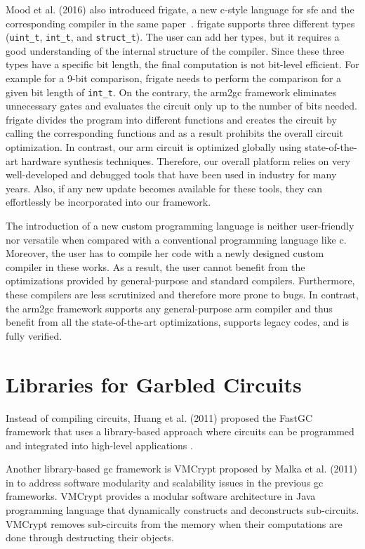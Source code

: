 Mood et al. (2016) also introduced \gls{frigate}, a new \gls{c}-style language for \acrshort{sfe} and the corresponding compiler in the same paper~\cite{mood2016frigate}.
\gls{frigate} supports three different types (\texttt{uint\_t}, \texttt{int\_t}, and \texttt{struct\_t}).
The user can add her types, but it requires a good understanding of the internal structure of the compiler.
Since these three types have a specific bit length, the final computation is not bit-level efficient.
For example for a 9-bit comparison, \gls{frigate} needs to perform the comparison for a given bit length of \texttt{int\_t}.
On the contrary, the \gls{arm2gc} framework eliminates unnecessary gates and evaluates the circuit only up to the number of bits needed.
\gls{frigate} divides the program into different functions and creates the circuit by calling the corresponding functions and as a result prohibits the overall circuit optimization.
In contrast, our \gls{arm} circuit is optimized globally using state-of-the-art hardware synthesis techniques.
Therefore, our overall platform relies on very well-developed and debugged tools that have been used in industry for many years.
Also, if any new update becomes available for these tools, they can effortlessly be incorporated into our framework.

The introduction of a new custom programming language is neither user-friendly nor versatile when compared with a conventional programming language like \gls{c}.
Moreover, the user has to compile her code with a newly designed custom compiler in these works.
As a result, the user cannot benefit from the optimizations provided by general-purpose and standard compilers.
Furthermore, these compilers are less scrutinized and therefore more prone to bugs.
In contrast, the \gls{arm2gc} framework supports any general-purpose \gls{arm} compiler and thus benefit from all the state-of-the-art optimizations, supports legacy codes, and is fully verified.

\section{Libraries for Garbled Circuits}\label{sec:related-library}
Instead of compiling circuits, Huang et al. (2011) proposed the FastGC framework that uses a library-based approach where circuits can be programmed and integrated into high-level applications \cite{huang2011faster}.

Another library-based \acrshort{gc} framework is VMCrypt proposed by Malka et al. (2011) in \cite{malka2011vmcrypt} to address software modularity and scalability issues in the previous \acrshort{gc} frameworks.
VMCrypt provides a modular software architecture in Java programming language that dynamically constructs and deconstructs sub-circuits.
VMCrypt removes sub-circuits from the memory when their computations are done through destructing their objects.

